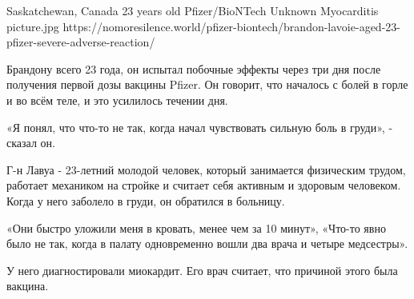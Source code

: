 {Saskatchewan, Canada}
{23 years old}
{Pfizer/BioNTech}
{Unknown}
{Myocarditis}
{picture.jpg}
{https://nomoresilence.world/pfizer-biontech/brandon-lavoie-aged-23-pfizer-severe-adverse-reaction/}
{

Брандону всего 23 года, он испытал побочные эффекты через три дня после
получения первой дозы вакцины Pfizer. Он говорит, что началось с болей в горле и
во всём теле, и это усилилось течении дня.

«Я понял, что что-то не так, когда начал чувствовать сильную боль в груди», -
сказал он.

Г-н Лавуа - 23-летний молодой человек, который занимается физическим трудом,
работает механиком на стройке и считает себя активным и здоровым
человеком. Когда у него заболело в груди, он обратился в больницу.

«Они быстро уложили меня в кровать, менее чем за 10 минут», «Что-то явно было не
так, когда в палату одновременно вошли два врача и четыре медсестры».

У него диагностировали миокардит. Его врач считает, что причиной этого была
вакцина.
}
